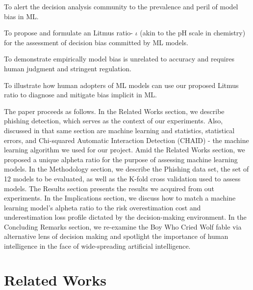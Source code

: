 \documentclass[deca,nonblindrev]{informs3} %
\begin{document}
\begin{henumerate}
\item To alert the decision analysis  community to the prevalence and peril of model bias in ML.

\item To propose and formulate an  Litmus ratio- $\iota$ (akin to the pH scale in chemistry) for the assessment of decision bias committed by  ML  models.
\item To demonstrate empirically model bias is unrelated to accuracy and requires human judgment and stringent regulation.
\item To illustrate  how human adopters of ML models can use our proposed Litmus ratio to diagnose and mitigate bias implicit in ML.
 
\end{henumerate}

The paper proceeds as follows. In the Related Works section, we describe phishing detection, which serves as the context of our experiments. Also, discussed in that same section are machine learning and statistics, statistical errors, and Chi-squared Automatic Interaction Detection (CHAID) - the machine learning algorithm we used for our project. Amid the Related Works section, we proposed a unique  alpheta ratio for the purpose of assessing machine learning models. In the Methodology section, we describe the Phishing data set, the set of 12 models to be evaluated, as well as the K-fold cross validation used to assess models. The Results section presents the results we acquired from out experiments. In the Implications section, we discuss how to match a machine learning model’s  alpheta  ratio to the risk overestimation cost and underestimation loss profile dictated by the decision-making environment. In the Concluding Remarks section, we re-examine the Boy Who Cried Wolf fable via alternative lens of decision making and spotlight the importance of human intelligence in the face of wide-spreading artificial intelligence. 


\section{Related Works }
\end{document}
